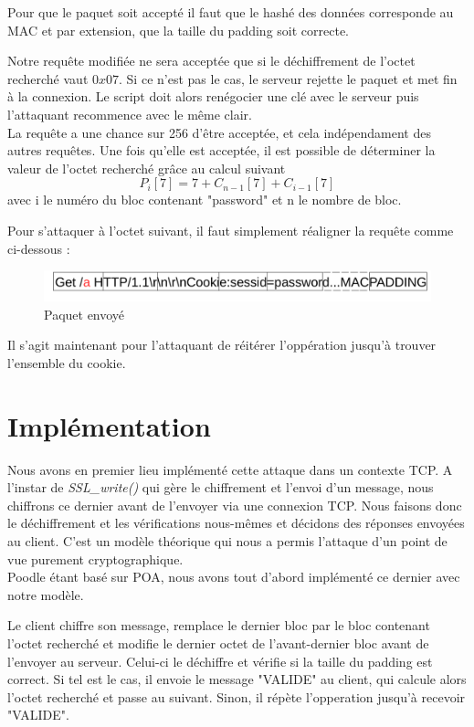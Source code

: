 Pour que le paquet soit accepté il faut que le hashé des données corresponde au MAC et par extension, que la taille 
du padding soit correcte.

Notre requête modifiée ne sera acceptée que si le déchiffrement de l'octet recherché vaut $0x07$. Si ce n'est pas 
le cas, le serveur rejette le paquet et met fin à la connexion. Le script doit alors renégocier une clé avec le
serveur puis l'attaquant recommence avec le même clair.\\

 La requête a une chance sur 256 d'être acceptée, et cela indépendament des autres requêtes. Une fois qu'elle est
acceptée, il est possible de déterminer la valeur de l'octet recherché grâce au calcul suivant
\[ P_i[7] = 7 + C_{n-1}[7] + C_{i-1}[7] \]
avec i le numéro du bloc contenant "password" et n le nombre de bloc.

Pour s'attaquer à l'octet suivant, il faut simplement réaligner la requête comme ci-dessous :

\begin{figure}[h]
\label{fig:packet2}
\centering
\includegraphics[scale=0.5]{Packet2}
\caption{Paquet envoyé}
\end{figure}

Il s'agit maintenant pour l'attaquant de réitérer l'oppération jusqu'à trouver l'ensemble du cookie.

\section{Implémentation}
\label{sec:imp}

Nous avons en premier lieu implémenté cette attaque dans un contexte TCP. A l'instar de \emph{SSL\_write()} qui gère le 
chiffrement et l'envoi d'un message, nous chiffrons ce dernier avant de l'envoyer via une connexion TCP.
Nous faisons donc le déchiffrement et les vérifications nous-mêmes et décidons des réponses envoyées au client.
C'est un modèle théorique qui nous a permis l'attaque d'un point de vue purement cryptographique. \\


Poodle étant basé sur POA, nous avons tout  d'abord implémenté ce dernier avec notre modèle.

 Le client chiffre son
message, remplace le dernier bloc par le bloc contenant l'octet recherché et modifie le dernier octet de l'avant-dernier bloc avant de l'envoyer au serveur. Celui-ci le déchiffre et vérifie si la taille du padding est correct. Si
tel est le cas, il envoie le message "VALIDE" au client, qui calcule alors l'octet recherché et passe au suivant.
Sinon, il répète l'opperation jusqu'à recevoir "VALIDE".\\

